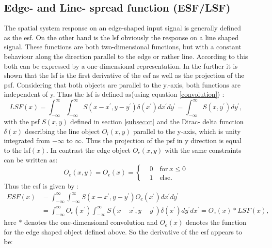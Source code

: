 \subsection{Edge- and Line- spread function (ESF/LSF)} \label{subsec:esflsf}
The spatial system response on an edge-shaped input signal is generally defined as the \gls{esf}. On the other hand is the \gls{lsf} obviously the response on a line shaped signal. These functions are both two-dimensional functions, but with a constant behaviour along the direction parallel to the edge or rather line. According to this both can be expressed by a one-dimensional representation. In the further it is shown that the \gls{lsf} is the first derivative of the \gls{esf} as well as the projection of the \gls{psf}. Considering that both objects are parallel to the y.-axis, both functions are independent of y. Thus the \acrlong{lsf} is defined as(using equation \ref{convolution}) \citep{Donath2007}:
\begin{equation}%
LSF(x) = \int_{-\infty}^{\infty} \int_{-\infty}^{\infty} S(x-x^{'},y-y^{'})\delta(x^{'}) dx^{'}dy^{'} =\int_{-\infty}^{\infty} S(x,y^{'}) dy^{'} ,
\end{equation}
with the \acrlong{psf} $S(x,y)$ defined in section \ref{subsec:ct} and the Dirac- delta function $\delta(x)$ describing the line object $O_{l}(x,y)$ parallel to the y-axis, which is unity integrated from  $ -\infty$ to $ \infty $. Thus the projection of the \acrlong{psf} in y direction is equal to the \gls{lsf}$(x)$. In contrast the edge object $O_{e}(x,y)$ with the same constraints can be written as:
\begin{equation}
O_{e}(x,y) = O_{e}(x) = 
\begin{cases}
 & 0 \quad \text{for}\ x\leq 0 \\ & 1 \quad \text{else}.
\end{cases}
\end{equation}
Thus the \gls{esf} is given by \citep{Donath2007}:
\begin{equation}
\begin{aligned}
ESF(x) & = \int_{-\infty}^{\infty} \int_{-\infty}^{\infty} S(x-x^{'},y-y^{'})O_{e}(x^{'}) dx^{'}dy^{'} \\
& = \int_{-\infty}^{\infty}O_{e}(x^{'}) \int_{-\infty}^{\infty} S(x-x^{'},y-y^{'})\delta(x^{'}) dy^{'} dx^{'} =  O_{e}(x) \ast LSF(x),
\end{aligned} 
\end{equation}
here $\ast$ denotes the one-dimensional convolution and $O_{e}(x)$ denotes the function for the edge shaped object defined above. So the derivative of the \gls{esf} appears to be:
